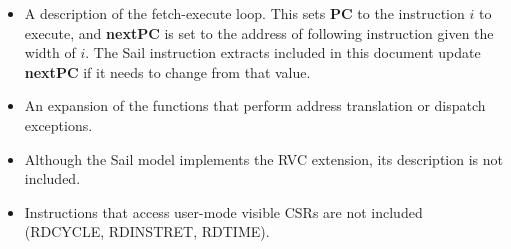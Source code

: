 \begin{itemize}
\item A description of the fetch-execute loop.  This sets \textbf{PC}
  to the instruction $i$ to execute, and \textbf{nextPC} is set to the
  address of following instruction given the width of $i$.  The Sail
  instruction extracts included in this document update
  \textbf{nextPC} if it needs to change from that value.
\item An expansion of the functions that perform address translation
  or dispatch exceptions.
\item Although the Sail model implements the RVC extension, its
  description is not included.
\item Instructions that access user-mode visible CSRs are not included
  (RDCYCLE, RDINSTRET, RDTIME).
\end{itemize}
